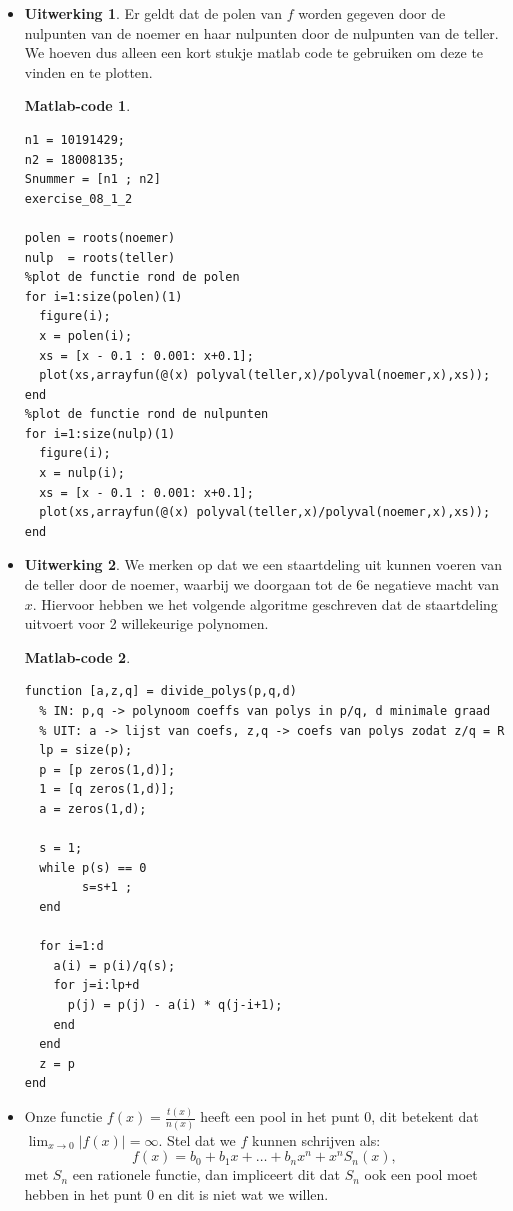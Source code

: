 \documentclass[11pt]{amsart}
\theoremstyle{definition}
\newtheorem*{uitwerking}{Uitwerking}
\newtheorem*{matlab}{Matlab-code}
\begin{document}
\begin{itemize}
\item[Deelvraag 1.]
  \begin{uitwerking}
    Er geldt dat de polen van $f$ worden gegeven door de nulpunten van de 
    noemer en haar nulpunten door de nulpunten van de teller.
    We hoeven dus alleen een kort stukje matlab code te gebruiken om
    deze te vinden en te plotten.
  \end{uitwerking}
  \begin{matlab}~
\begin{verbatim}
n1 = 10191429;
n2 = 18008135;
Snummer = [n1 ; n2]
exercise_08_1_2

polen = roots(noemer)
nulp  = roots(teller)
%plot de functie rond de polen
for i=1:size(polen)(1)
  figure(i);
  x = polen(i);
  xs = [x - 0.1 : 0.001: x+0.1];
  plot(xs,arrayfun(@(x) polyval(teller,x)/polyval(noemer,x),xs));
end
%plot de functie rond de nulpunten
for i=1:size(nulp)(1)
  figure(i);
  x = nulp(i);
  xs = [x - 0.1 : 0.001: x+0.1];
  plot(xs,arrayfun(@(x) polyval(teller,x)/polyval(noemer,x),xs));
end
\end{verbatim}
  \end{matlab}
\item[Deelvraag 2.]
  \begin{uitwerking}
    We merken op dat we een staartdeling uit kunnen voeren van de teller door de noemer, waarbij we doorgaan tot de 6e negatieve macht van $x$. Hiervoor hebben we het volgende algoritme geschreven dat de staartdeling uitvoert voor 2 willekeurige polynomen.
    \end{uitwerking}
\begin{matlab}
\begin{verbatim}
function [a,z,q] = divide_polys(p,q,d)
  % IN: p,q -> polynoom coeffs van polys in p/q, d minimale graad
  % UIT: a -> lijst van coefs, z,q -> coefs van polys zodat z/q = R
  lp = size(p);
  p = [p zeros(1,d)];
  1 = [q zeros(1,d)];
  a = zeros(1,d);

  s = 1;
  while p(s) == 0
        s=s+1 ;
  end

  for i=1:d
    a(i) = p(i)/q(s);
    for j=i:lp+d
      p(j) = p(j) - a(i) * q(j-i+1);
    end
  end
  z = p
end
\end{verbatim}
\end{matlab}
\item[Deelvraag 3.]
  Onze functie $f(x) =\frac{t(x)}{n(x)}$ heeft een pool in het punt $0$,
  dit betekent dat $\lim_{x\to 0} |f(x)| = \infty$. Stel dat we $f$ kunnen schrijven als:
  \[
  f(x) = b_0 + b_1 x + \ldots + b_n x^n + x^n S_n(x),
  \]
  met $S_n$ een rationele functie, dan impliceert dit dat $S_n$ ook een pool
  moet hebben in het punt $0$ en dit is niet wat we willen.

\end{itemize}
\end{document}
